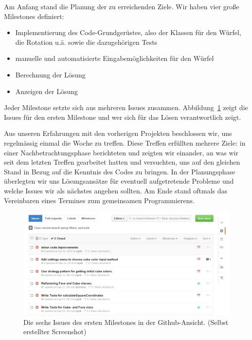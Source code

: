 Am Anfang stand die Planung der zu erreichenden Ziele. Wir haben vier große
Milestones definiert:

\begin{itemize}

  \item Implementierung des Code-Grundgerüstes, also der Klassen für den Würfel,
    die Rotation u.ä. sowie die dazugehörigen Tests
  \item manuelle und automatisierte Eingabemöglichkeiten für den Würfel
  \item Berechnung der Lösung
  \item Anzeigen der Lösung
\end{itemize}

Jeder Milestone setzte sich aus mehreren Issues zusammen.
Abbildung~\ref{fig:github_issues} zeigt die Issues für den ersten Milestone und
wer sich für das Lösen verantwortlich zeigt.

Aus unseren Erfahrungen mit den vorherigen Projekten beschlossen wir, uns
regelmässig einmal die Woche zu treffen. Diese Treffen erfüllten mehrere Ziele:
in einer Nachbetrachtungsphase berichteten und zeigten wir einander, an was wir
seit dem letzten Treffen gearbeitet hatten und versuchten, uns auf den gleichen
Stand in Bezug auf die Kenntnis des Codes zu bringen. In der Planungsphase
überlegten wir uns Lösungsansätze für eventuell aufgetretende Probleme und
welche Issues wir als nächstes angehen sollten. Am Ende stand oftmals das
Vereinbaren eines Termines zum gemeinsamen Programmierens.

\begin{figure}[ht!]
  \centering
  \includegraphics[width=\textwidth]{pics/github_issues.png}
  \caption{Die sechs Issues des ersten Milestones in der Github-Ansicht.
  (Selbst erstellter Screenshot)}
  \label{fig:github_issues}
\end{figure}



